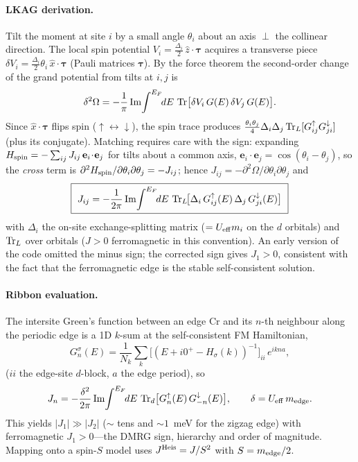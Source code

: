 \documentclass[11pt]{article}
\begin{document}
\paragraph{LKAG derivation.} Tilt the moment at site $i$ by a small angle $\theta_i$ about an axis
$\perp$ the collinear direction. The local spin potential
$V_i=\tfrac{\Delta_i}{2}\,\hat z\!\cdot\!\boldsymbol\tau$ acquires a transverse piece
$\delta V_i=\tfrac{\Delta_i}{2}\theta_i\,\hat x\!\cdot\!\boldsymbol\tau$ (Pauli matrices
$\boldsymbol\tau$). By the force theorem the second-order change of the grand potential from tilts
at $i,j$ is
\begin{equation}
\delta^2\Omega=-\frac1\pi\,{\rm Im}\!\int^{E_F}\!\!dE\ {\rm Tr}\big[\delta V_i\,G(E)\,\delta V_j\,G(E)\big].
\end{equation}
Since $\hat x\!\cdot\!\boldsymbol\tau$ flips spin ($\uparrow\!\leftrightarrow\!\downarrow$), the spin
trace produces $\tfrac{\theta_i\theta_j}{4}\Delta_i\Delta_j\,{\rm Tr}_L[G^\uparrow_{ij}G^\downarrow_{ji}]$
(plus its conjugate). Matching requires care with the sign: expanding
$H_{\rm spin}=-\sum_{ij}J_{ij}\,\mathbf e_i\!\cdot\!\mathbf e_j$ for tilts about a common axis,
$\mathbf e_i\!\cdot\!\mathbf e_j=\cos(\theta_i-\theta_j)$, so the \emph{cross} term is
$\partial^2 H_{\rm spin}/\partial\theta_i\partial\theta_j=-J_{ij}$; hence
$J_{ij}=-\partial^2\Omega/\partial\theta_i\partial\theta_j$ and
\begin{equation}
\boxed{\ J_{ij}=-\frac1{2\pi}\,{\rm Im}\!\int^{E_F}\!\!dE\ {\rm Tr}_L\!\big[\Delta_i\,G^\uparrow_{ij}(E)\,\Delta_j\,G^\downarrow_{ji}(E)\big]\ }
\end{equation}
with $\Delta_i$ the on-site exchange-splitting matrix ($=U_{\rm eff}m_i$ on the $d$ orbitals) and
${\rm Tr}_L$ over orbitals ($J>0$ ferromagnetic in this convention). An early version of the
code omitted the minus sign; the corrected sign gives $J_1>0$, consistent with the fact that
the ferromagnetic edge is the stable self-consistent solution.

\paragraph{Ribbon evaluation.} The intersite Green's function between an edge Cr and its $n$-th
neighbour along the periodic edge is a 1D $k$-sum at the self-consistent FM Hamiltonian,
\begin{equation}
G^\sigma_{n}(E)=\frac1{N_k}\sum_k\big[(E+i0^+-H_\sigma(k))^{-1}\big]_{ii}\,e^{ikna},
\end{equation}
($ii$ the edge-site $d$-block, $a$ the edge period), so
\begin{equation}
J_n=-\frac{\delta^2}{2\pi}\,{\rm Im}\!\int^{E_F}\!\!dE\ {\rm Tr}_d\big[G^\uparrow_{n}(E)\,G^\downarrow_{-n}(E)\big],
\qquad \delta=U_{\rm eff}\,m_{\rm edge}.
\end{equation}
This yields $|J_1|\gg|J_2|$ ($\sim$ tens and $\sim\!1$~meV for the zigzag edge) with
ferromagnetic $J_1>0$---the
DMRG sign, hierarchy and order of magnitude. Mapping onto a spin-$S$ model uses $J^{\rm Heis}=J/S^2$
with $S=m_{\rm edge}/2$.
\end{document}
